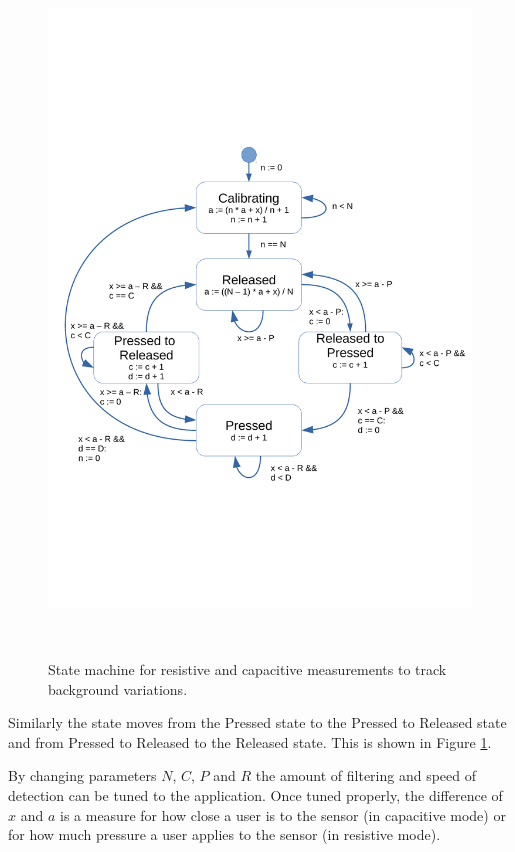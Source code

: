 \documentclass{sigchi-ext}
\begin{document}
\begin{figure}
\centering
\includegraphics[trim={0 6.2cm 0 6.8cm},clip,width=0.9\columnwidth]{figures/state_machine}
 \caption{State machine for resistive and capacitive measurements to track
background variations.}~\label{fig:state_machine}
\end{figure}

Similarly the state moves from the Pressed state to the Pressed to Released
state and from Pressed to Released to the Released state. This is shown in Figure \ref{fig:state_machine}.

By changing parameters $N$, $C$, $P$ and $R$ the amount of filtering and
speed of detection can be tuned to the application. Once tuned
properly, the difference of $x$ and $a$ is a measure for how close a user is to
the sensor (in capacitive mode) or for how much pressure a user applies
to the sensor (in resistive mode).
\end{document}

